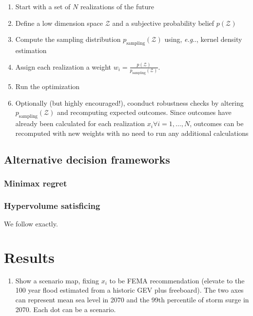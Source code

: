 \documentclass[12pt]{article}
\makeatletter
\DeclareRobustCommand\onedot{\futurelet\@let@token\@onedot}
\def\@onedot{\ifx\@let@token.\else.\null\fi\xspace}
\def\eg{\emph{e.g}\onedot} \def\Eg{\emph{E.g}\onedot}
\makeatother
\begin{document}
\begin{enumerate}
\begin{enumerate}
              \item Start with a set of $N$ realizations of the future
              \item Define a low dimension space $\mathcal{Z}$ and a subjective probability belief $p(\mathcal{Z})$
              \item Compute the sampling distribution $p_\text{sampling}(\mathcal{Z})$ using, \eg, kernel density estimation
              \item Assign each realization a weight $w_i = \frac{p(\mathcal{Z})}{p_\text{sampling}(\mathcal{Z})}$.
              \item Run the optimization
              \item Optionally (but highly encouraged!), coonduct robustness checks by altering $p_\text{sampling}(\mathcal{Z})$ and recomputing expected outcomes. Since outcomes have already been calculated for each realization $x_i \forall i=1,\ldots,N$, outcomes can be recomputed with new weights with no need to run any additional calculations
          \end{enumerate}
\end{enumerate}

\subsection{Alternative decision frameworks}\label{sec:methods-alternative}

\subsubsection{Minimax regret}

\subsubsection{Hypervolume satisficing}

We follow \citet{zarekarizi_suboptimal:2020} exactly.

\section{Results}

\begin{enumerate}
    \item Show a scenario map, fixing $x_i$ to be FEMA recommendation (elevate to the 100 year flood estimated from a historic GEV plus freeboard). The two axes can represent mean sea level in 2070 and the 99th percentile of storm surge in 2070. Each dot can be a scenario.
\end{enumerate}
\end{document}
